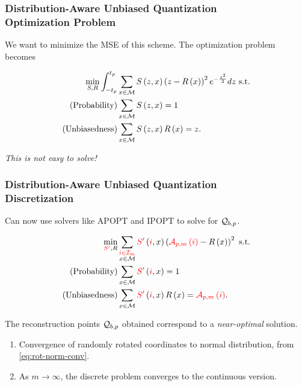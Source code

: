 \documentclass{beamer}
\begin{document}
    \begin{frame}
        \frametitle{Distribution-Aware Unbiased Quantization\\\small Optimization Problem}
        We want to minimize the MSE of this scheme. The optimization problem
        becomes

        \begin{align}
            \min_{S,R} \int_{-t_p}^{t_p} &\sum_{x\in\cM}S\brak{z,x}\brak{z-R\brak{x}}^2e^{-\frac{z^2}{2}}dz\ \text{s.t.} \\
            \text{(Probability)} &\sum_{x\in\cM}S\brak{z,x} = 1 \\
            \text{(Unbiasedness)} &\sum_{x\in\cM}S\brak{z,x}R\brak{x} = z.
            \label{eq:opt-prob-dauq}
        \end{align}

        \emph{This is not easy to solve!}
    \end{frame}

    \begin{frame}
        \frametitle{Distribution-Aware Unbiased Quantization\\\small Discretization}
        Can now use solvers like APOPT \cite{APOPT} and IPOPT \cite{IPOPT} to
        solve for \(\mathcal Q_{b,p}\). 

        \begin{align}
            \min_{\textcolor{red}{S^\prime},R} &\sum_{\substack{\textcolor{red}{i\in\mathcal I_m}\\x\in\mathcal M}}\textcolor{red}{S^\prime}\left(\textcolor{red}{i},x\right)\left(\textcolor{red}{\mathcal A_{p,m}\left(i\right)}-R\left(x\right)\right)^2 \text{ s.t.} \\
            \text{(Probability)} &\sum_{x\in\mathcal M}\textcolor{red}{S^\prime}\left(\textcolor{red}{i},x\right) = 1 \\
            \text{(Unbiasedness)} &\sum_{x\in\mathcal M}\textcolor{red}{S^\prime}\left(\textcolor{red}{i},x\right)R\left(x\right) = \textcolor{red}{\mathcal A_{p,m}\left(i\right)}.
            \label{eq:opt-prob-dauq-disc}
        \end{align}

        The reconstruction points \(\mathcal Q_{b,p}\) obtained correspond to a
        \emph{near-optimal} solution.
        \begin{enumerate}
            \item Convergence of randomly rotated coordinates to normal
            distribution, from \eqref{eq:rot-norm-conv}.
            \item As \(m\to\infty\), the discrete problem converges to the
            continuous version.
        \end{enumerate}
    \end{frame}
\end{document}
